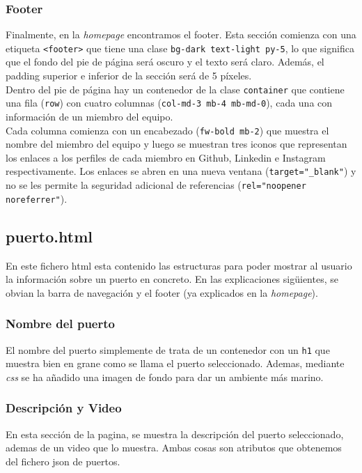 \documentclass{article}
\begin{document}
\subsubsection{Footer}
Finalmente, en la \textit{homepage} encontramos el footer. Esta sección comienza con una etiqueta \texttt{<footer>} que tiene una clase \texttt{bg-dark text-light py-5}, lo que significa que el fondo del pie de página será oscuro y el texto será claro. Además, el padding superior e inferior de la sección será de 5 píxeles.\\

\noindent Dentro del pie de página hay un contenedor de la clase \texttt{container} que contiene una fila (\texttt{row}) con cuatro columnas (\texttt{col-md-3 mb-4 mb-md-0}), cada una con información de un miembro del equipo.\\

\noindent Cada columna comienza con un encabezado (\texttt{fw-bold mb-2}) que muestra el nombre del miembro del equipo y luego se muestran tres iconos que representan los enlaces a los perfiles de cada miembro en Github, Linkedin e Instagram respectivamente. Los enlaces se abren en una nueva ventana (\texttt{target="\_blank"}) y no se les permite la seguridad adicional de referencias (\texttt{rel="noopener noreferrer"}).

\subsection{puerto.html}
En este fichero html esta contenido las estructuras para poder mostrar al usuario la información sobre un puerto en concreto. En las explicaciones sigüientes, se obvian la barra de navegación y el footer (ya explicados en la \textit{homepage}).

\subsubsection{Nombre del puerto}
El nombre del puerto simplemente de trata de un contenedor con un \texttt{h1} que muestra bien en grane como se llama el puerto seleccionado. Ademas, mediante \textit{css} se ha añadido una imagen de fondo para dar un ambiente más marino.

\subsubsection{Descripción y Video}
En esta sección de la pagina, se muestra la descripción del puerto seleccionado, ademas de un video que lo muestra. Ambas cosas son atributos que obtenemos del fichero json de puertos.\\
\end{document}
